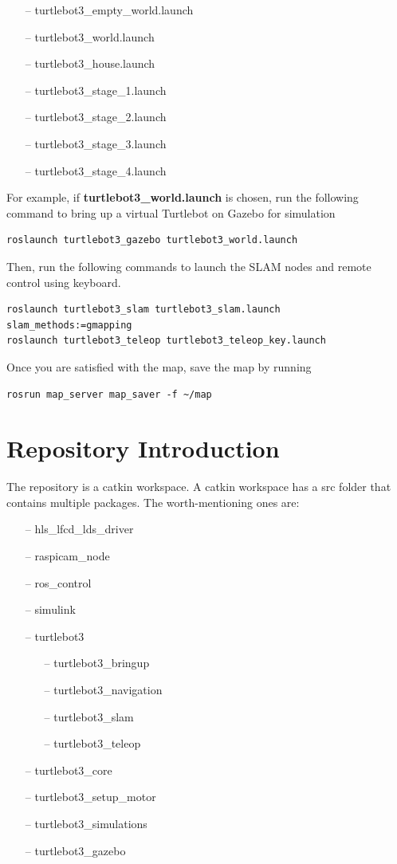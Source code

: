\documentclass[12]{article}
\begin{document}
\begin{itemize}
    \item[--] turtlebot3\_empty\_world.launch
    \item[--] turtlebot3\_world.launch
    \item[--] turtlebot3\_house.launch
    \item[--] turtlebot3\_stage\_1.launch
    \item[--] turtlebot3\_stage\_2.launch
    \item[--] turtlebot3\_stage\_3.launch 
    \item[--] turtlebot3\_stage\_4.launch
\end {itemize}
For example, if \textbf{turtlebot3\_world.launch} is chosen, run the following command to bring up a virtual Turtlebot on Gazebo for simulation
\begin{lstlisting}[style=bash]
roslaunch turtlebot3_gazebo turtlebot3_world.launch
\end{lstlisting}
\newpage
Then, run the following commands to launch the SLAM nodes and remote control using keyboard. 
\begin{lstlisting}[style=bash]
roslaunch turtlebot3_slam turtlebot3_slam.launch slam_methods:=gmapping
roslaunch turtlebot3_teleop turtlebot3_teleop_key.launch
\end{lstlisting}
Once you are satisfied with the map, save the map by running
\begin{lstlisting}[style=bash]
rosrun map_server map_saver -f ~/map
\end{lstlisting}
\newpage
\section{Repository Introduction}
The repository is a catkin workspace. A catkin workspace has a src folder that contains multiple packages. The worth-mentioning ones are:
\begin{itemize}
	\item[--] hls\_lfcd\_lds\_driver
    \item[--] raspicam\_node
    \item[--] ros\_control
    \item[--] simulink
    \item[--] turtlebot3
    \begin{itemize}
        \item[--] turtlebot3\_bringup
        \item[--] turtlebot3\_navigation
        \item[--] turtlebot3\_slam
        \item[--] turtlebot3\_teleop
    \end {itemize}
    \item[--] turtlebot3\_core
    \item[--] turtlebot3\_setup\_motor
    \item[--] turtlebot3\_simulations
        \item[--] turtlebot3\_gazebo
\end{itemize} 
\end{document}

